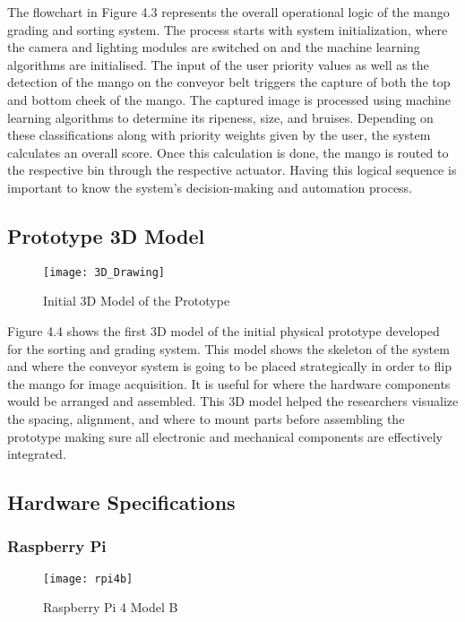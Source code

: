 The flowchart in Figure 4.3 represents the overall operational logic of the
mango grading and sorting system. The process starts with system initialization,
where the camera and lighting modules are switched on and the machine learning
algorithms are initialised. The input of the user priority values as well as the
detection of the mango on the conveyor belt triggers the capture of both the top
and bottom cheek of the mango. The captured image is processed using machine
learning algorithms to determine its ripeness, size, and bruises. Depending on
these classifications along with priority weights given by the user, the system
calculates an overall score. Once this calculation is done, the mango is routed
to the respective bin through the respective actuator. Having this logical
sequence is important to know the system's decision-making and automation
process.


\subsection{Prototype 3D Model}
\begin{figure}[!htbp]
	\centering
	\texttt{[image: 3D\_Drawing]}
	\caption{Initial 3D Model of the Prototype}
	\label{fig:3dModel_fig}
\end{figure}

Figure 4.4 shows the first 3D model of the initial physical prototype developed
for the sorting and grading system. This model shows the skeleton of the system
and where the conveyor system is going to be placed strategically in order to
flip the mango for image acquisition. It is useful for where the hardware
components would be arranged and assembled. This 3D model helped the researchers
visualize the spacing, alignment, and where to mount parts before assembling the
prototype making sure all electronic and mechanical components are effectively
integrated.

\subsection{Hardware Specifications}

\subsubsection{Raspberry Pi}
\begin{figure}[!htbp]
	\centering
	\texttt{[image: rpi4b]}
	\caption{Raspberry Pi 4 Model B}
	\label{fig:rpi4b_fig}
\end{figure}

